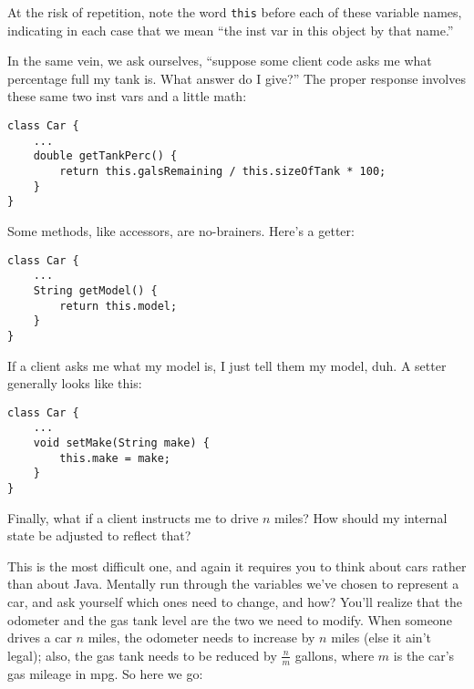 At the risk of repetition, note the word \texttt{this} before each of these
variable names, indicating in each case that we mean ``the inst var in this
object by that name.''

\medskip

In the same vein, we ask ourselves, ``suppose some client code asks me what
percentage full my tank is. What answer do I give?'' The proper response
involves these same two inst vars and a little math:

\begin{Verbatim}[samepage=true,fontsize=\scriptsize,frame=single]
class Car {
    ...
    double getTankPerc() {
        return this.galsRemaining / this.sizeOfTank * 100;
    }
}
\end{Verbatim}
\vspace{-.15in}

Some methods, like accessors, are no-brainers. Here's a getter:

\vspace{-.15in}
\begin{Verbatim}[samepage=true,fontsize=\scriptsize,frame=single]
class Car {
    ...
    String getModel() {
        return this.model;
    }
}
\end{Verbatim}
\vspace{-.15in}

If a client asks me what my model is, I just tell them my model, duh. A setter
generally looks like this:
\vspace{-.15in}
\begin{Verbatim}[samepage=true,fontsize=\scriptsize,frame=single]
class Car {
    ...
    void setMake(String make) {
        this.make = make;
    }
}
\end{Verbatim}

\medskip

\pagebreak
{}
Finally, what if a client instructs me to drive $n$ miles? How should my
internal state be adjusted to reflect that?

This is the most difficult one, and again it requires you to think about cars
rather than about Java. Mentally run through the variables we've chosen to
represent a car, and ask yourself which ones need to change, and how? You'll
realize that the odometer and the gas tank level are the two we need to
modify. When someone drives a car $n$ miles, the odometer needs to increase by
$n$ miles (else it ain't legal); also, the gas tank needs to be reduced by
$\frac{n}{m}$ gallons, where $m$ is the car's gas mileage in mpg. So here we
go:

